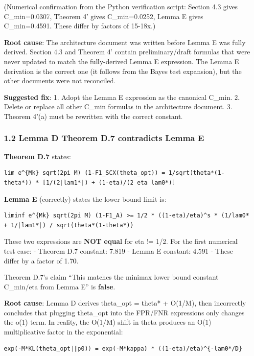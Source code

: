 \documentclass[
  12pt,
]{ctexart}
\begin{document}
(Numerical confirmation from the Python verification script: Section 4.3
gives C\_min=0.0307, Theorem 4' gives C\_min=0.0252, Lemma E gives
C\_min=0.4591. These differ by factors of 15-18x.)

\textbf{Root cause}: The architecture document was written before Lemma
E was fully derived. Section 4.3 and Theorem 4' contain
preliminary/draft formulas that were never updated to match the
fully-derived Lemma E expression. The Lemma E derivation is the correct
one (it follows from the Bayes test expansion), but the other documents
were not reconciled.

\textbf{Suggested fix}: 1. Adopt the Lemma E expression as the canonical
C\_min. 2. Delete or replace all other C\_min formulas in the
architecture document. 3. Theorem 4'(a) must be rewritten with the
correct constant.

\subsubsection{1.2 Lemma D Theorem D.7 contradicts Lemma
E}\label{lemma-d-theorem-d.7-contradicts-lemma-e}

\textbf{Theorem D.7} states:

\begin{verbatim}
lim e^{Mk} sqrt(2pi M) (1-F1_SCX(theta_opt)) = 1/sqrt(theta*(1-theta*)) * [1/(2|lam1*|) + (1-eta)/(2 eta lam0*)]
\end{verbatim}

\textbf{Lemma E} (correctly) states the lower bound limit is:

\begin{verbatim}
liminf e^{Mk} sqrt(2pi M) (1-F1_A) >= 1/2 * ((1-eta)/eta)^s * (1/lam0* + 1/|lam1*|) / sqrt(theta*(1-theta*))
\end{verbatim}

These two expressions are \textbf{NOT equal} for eta != 1/2. For the
first numerical test case: - Theorem D.7 constant: 7.819 - Lemma E
constant: 4.591 - These differ by a factor of 1.70.

Theorem D.7's claim ``This matches the minimax lower bound constant
C\_min/eta from Lemma E'' is \textbf{false}.

\textbf{Root cause}: Lemma D derives theta\_opt = theta* + O(1/M), then
incorrectly concludes that plugging theta\_opt into the FPR/FNR
expressions only changes the o(1) term. In reality, the O(1/M) shift in
theta produces an O(1) multiplicative factor in the exponential:

\begin{verbatim}
exp(-M*KL(theta_opt||p0)) = exp(-M*kappa) * ((1-eta)/eta)^{-lam0*/D}
\end{verbatim}
\end{document}
